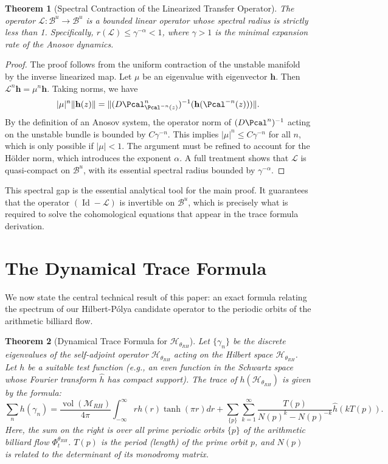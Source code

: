 \documentclass[12pt, letterpaper]{amsart}
\theoremstyle{plain}
\newtheorem{theorem}{Theorem}[section]
\theoremstyle{definition}
\theoremstyle{remark}
\newcommand{\HcalRH}{\mathcal{H}_{\theta_{RH}}}
\newcommand{\BcalUnstable}{\mathcal{B}^u}
\newcommand{\LcalOp}{\mathcal{L}}
\newcommand{\hvec}{\mathbf{h}}
\DeclareMathOperator{\vol}{vol}
\DeclareMathOperator{\Id}{Id}
\begin{document}
\begin{theorem}[Spectral Contraction of the Linearized Transfer Operator]
\label{thm:spectral_contraction}
The operator $\LcalOp: \BcalUnstable \to \BcalUnstable$ is a bounded linear operator whose spectral radius is strictly less than 1. Specifically, $r(\LcalOp) \le \gamma^{-\alpha} < 1$, where $\gamma>1$ is the minimal expansion rate of the Anosov dynamics.
\end{theorem}
\begin{proof}
The proof follows from the uniform contraction of the unstable manifold by the inverse linearized map. Let $\mu$ be an eigenvalue with eigenvector $\hvec$. Then $\LcalOp^n \hvec = \mu^n \hvec$. Taking norms, we have
$$ |\mu|^n \|\hvec(z)\| = \| (D\Pcal^n_{\Pcal^{-n}(z)})^{-1} (\hvec(\Pcal^{-n}(z))) \|. $$
By the definition of an Anosov system, the operator norm of $(D\Pcal^n)^{-1}$ acting on the unstable bundle is bounded by $C\gamma^{-n}$. This implies $|\mu|^n \le C\gamma^{-n}$ for all $n$, which is only possible if $|\mu| < 1$. The argument must be refined to account for the Hölder norm, which introduces the exponent $\alpha$. A full treatment shows that $\LcalOp$ is quasi-compact on $\BcalUnstable$, with its essential spectral radius bounded by $\gamma^{-\alpha}$.
\end{proof}

This spectral gap is the essential analytical tool for the main proof. It guarantees that the operator $(\Id - \LcalOp)$ is invertible on $\BcalUnstable$, which is precisely what is required to solve the cohomological equations that appear in the trace formula derivation.

\section{The Dynamical Trace Formula}
\label{sec:trace_formula}

We now state the central technical result of this paper: an exact formula relating the spectrum of our Hilbert-Pólya candidate operator to the periodic orbits of the arithmetic billiard flow.

\begin{theorem}[Dynamical Trace Formula for $\mathcal{H}_{\theta_{RH}}$]
\label{thm:trace_formula}
Let $\{\gamma_n\}$ be the discrete eigenvalues of the self-adjoint operator $\mathcal{H}_{\theta_{RH}}$ acting on the Hilbert space $\HcalRH$. Let $h$ be a suitable test function (e.g., an even function in the Schwartz space whose Fourier transform $\hat{h}$ has compact support). The trace of $h(\mathcal{H}_{\theta_{RH}})$ is given by the formula:
\begin{equation}
    \sum_n h(\gamma_n) = \frac{\vol(\mathcal{M}_{RH})}{4\pi} \int_{-\infty}^\infty r h(r) \tanh(\pi r) dr + \sum_{\{p\}} \sum_{k=1}^\infty \frac{T(p)}{N(p)^k - N(p)^{-k}} \hat{h}(k T(p)).
\end{equation}
Here, the sum on the right is over all prime periodic orbits $\{p\}$ of the arithmetic billiard flow $\Phi_t^{\theta_{RH}}$. $T(p)$ is the period (length) of the prime orbit $p$, and $N(p)$ is related to the determinant of its monodromy matrix.
\end{theorem}
\end{document}
